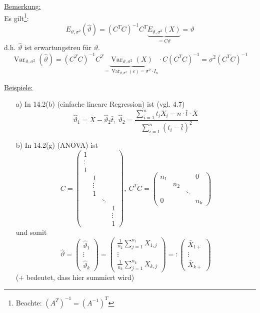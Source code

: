 \documentclass[a4paper,11pt,twoside,titlepage]{article}
\DeclareMathOperator{\var}{Var}
\begin{document}
\underline{Bemerkung:}\\
Es gilt\footnote{Beachte: $(A^T)^{-1}=(A^{-1})^T$}:
\[E_{\vartheta,\sigma^2}(\hat\vartheta)=(C^TC)^{-1}C^T\underbrace{E_{\vartheta,\sigma^2}(X)}_{=C\vartheta}=\vartheta\]
d.h. $\hat\vartheta$ ist erwartungstreu für $\vartheta$.
\[\var_{\vartheta,\sigma^2}(\hat\vartheta)=(C^TC)^{-1}C^T\underbrace{\var_{\vartheta,\sigma^2}(X)}_{=\var_{\vartheta,\sigma^2}(\varepsilon)=\sigma^2\cdot I_n}\cdot C(C^TC)^{-1}=\sigma^2(C^TC)^{-1}\]

\underline{Beispiele:}
\begin{itemize}
\item[a) ]In 14.2(b) (einfache lineare Regression) ist (vgl. 4.7)
\[\hat\vartheta_1=\bar{X}-\hat\vartheta_2\bar{t},\ \hat\vartheta_2=
\frac{\sum_{i=1}^nt_iX_i-n\cdot\bar{t}\cdot\bar{X}}{\sum_{i=1}^n(t_i-\bar{t})^2}\]
\item[b) ]In 14.2(g) (ANOVA) ist
\[C=\begin{pmatrix}1&&&\\\vdots&&&\\1&&&\\&1&&\\&\vdots&&\\&1&&\\&&\ddots&\\&&&1\\&&&\vdots\\&&&1\end{pmatrix},\ C^TC=\begin{pmatrix}n_1&&&0\\&n_2&&\\&&\ddots&\\0&&&n_k\end{pmatrix}\]
und somit
\[\hat\vartheta=\begin{pmatrix}\hat\vartheta_1\\\vdots\\\hat\vartheta_k\end{pmatrix}=\begin{pmatrix}\frac{1}{n_2}\sum_{j=1}^{n_1}X_{1,j}\\\vdots\\\frac{1}{n_k}\sum_{j=1}^{n_k}X_{k,j}\end{pmatrix}=:\begin{pmatrix}\bar X_{1+}\\\vdots\\\bar X_{k+}\end{pmatrix}\]
(+ bedeutet, dass hier summiert wird)
\end{itemize}
\end{document}
